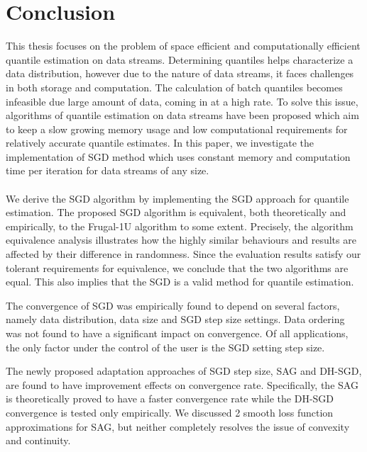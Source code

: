 \chapter{Conclusion}
\label{ch: conclusion}


This thesis focuses on the problem of space efficient and computationally efficient quantile estimation on data streams.
Determining quantiles helps characterize a data distribution, however due to the nature of data streams, it faces challenges in both storage and computation. The calculation of batch quantiles becomes infeasible due large amount of data, coming in at a high rate.
To solve this issue, algorithms of quantile estimation on data streams have been proposed which aim to keep a slow growing memory usage and low computational requirements for relatively accurate quantile estimates.
In this paper, we investigate the implementation of SGD method which uses constant memory and computation time per iteration for data streams of any size.
\\\\
We derive the SGD algorithm by implementing the SGD approach for quantile estimation. The proposed SGD algorithm is equivalent, both theoretically and empirically, to the Frugal-1U algorithm to some extent. Precisely, the algorithm equivalence analysis illustrates how the highly similar behaviours and results are affected by their difference in randomness. Since the evaluation results satisfy our tolerant requirements for equivalence, we conclude that the two algorithms are equal. This also implies that the SGD is a valid method for quantile estimation.

The convergence of SGD was empirically found to depend on several factors,
namely data distribution, data size and SGD step size settings. Data ordering was not found to have a significant impact on convergence. Of all applications, the only factor under the control of the user is the SGD setting step size. 

The newly proposed adaptation approaches of SGD step size, SAG and DH-SGD, are found to have improvement effects on convergence rate. Specifically, the SAG is theoretically proved to have a faster convergence rate while the DH-SGD convergence is tested only empirically. 
We discussed 2 smooth loss function approximations for SAG, but neither completely resolves the issue of convexity and continuity.

